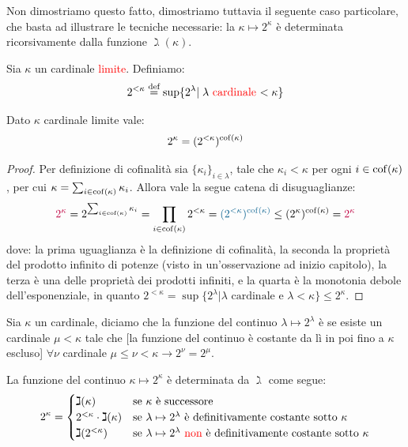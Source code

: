 Non dimostriamo questo fatto, dimostriamo tuttavia il seguente caso particolare, che basta ad illustrare le tecniche necessarie: la 
$\kappa \mapsto 2^{\kappa}$ \`e determinata ricorsivamente dalla funzione $\gimel(\kappa)$.

\begin{definition}
	Sia $\kappa$ un cardinale \textcolor{red}{limite}. Definiamo:
	\[ 2^{<\kappa} \overset{\text{def}}{=} \sup\{2^\lambda | \; \text{$\lambda$ \textcolor{red}{cardinale} $<\kappa$}\}
		\]
\end{definition}

\begin{lemma}
	Dato $\kappa$ cardinale limite vale:
	\[ 2^{\kappa} = (2^{<\kappa})^{\operatorname{cof}(\kappa)}
		\]
\end{lemma}

\begin{proof}
	Per definizione di cofinalit\`a sia $\{\kappa_i\}_{i \in \lambda}$, tale che $\kappa_i < \kappa$ per ogni $i \in \operatorname{cof}(\kappa)$, per cui $\kappa = \sum_{i \in \operatorname{cof}(\kappa)}\kappa_i$. Allora vale la segue catena di disuguaglianze:
	\[  \textcolor{purple}{2^\kappa} = 2^{\sum_{i \in \cof(\kappa)}\kappa_i}
									 = \prod_{i \in \cof(\kappa)} 2^{<\kappa}
									 = \textcolor{MidnightBlue}{(2^{<\kappa})^{\cof(\kappa)}}
									 \leq (2^\kappa)^{\cof(\kappa)} = \textcolor{purple}{2^\kappa}
		\]
	dove: la prima uguaglianza \`e la definizione di cofinalit\`a, la seconda la propriet\`a del prodotto infinito di potenze (visto in un'osservazione ad inizio capitolo), la terza \`e una delle propriet\`a dei prodotti infiniti,
	e la quarta \`e la monotonia debole dell'esponenziale, in quanto $2^{<\kappa} = \sup\{2^{\lambda}|\text{$\lambda$ cardinale e } \lambda < \kappa\} \leq 2^\kappa$.
\end{proof}

\begin{definition}
	Sia $\kappa$ un cardinale, diciamo che la funzione del continuo $\lambda \mapsto 2^\lambda$ \`e  se esiste un cardinale $\mu < \kappa$ tale che [la funzione del
	continuo \`e costante da l\`i in poi fino a $\kappa$ escluso] $\forall \nu$ cardinale $\mu \leq \nu < \kappa \rightarrow 2^\nu = 2^\mu$.
\end{definition}

\begin{proposition}
	La funzione del continuo $\kappa \mapsto 2^{\kappa}$ \`e determinata da $\gimel$ come segue:
	\[ 2^{\kappa} = \begin{cases}
		\gimel(\kappa) &\text{se $\kappa$ \`e successore} \\
		2^{<\kappa} \cdot \gimel(\kappa) &\text{se $\lambda \mapsto 2^\lambda$ \`e definitivamente costante sotto $\kappa$} \\
		\gimel(2^{<\kappa}) &\text{se $\lambda \mapsto 2^\lambda$ \textcolor{red}{non} \`e definitivamente costante sotto $\kappa$} \\
	\end{cases}
		\]
\end{proposition}

